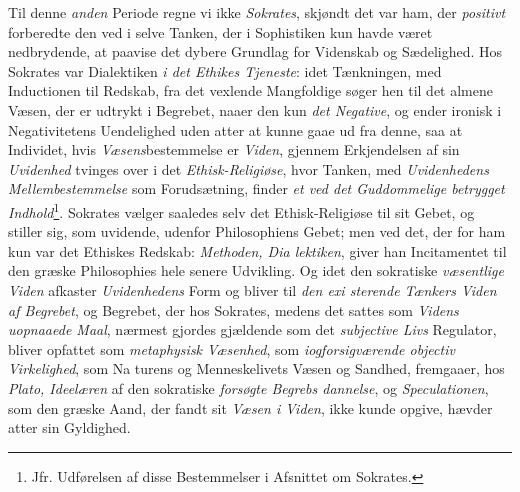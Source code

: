 Til denne \emph{anden} Periode regne vi ikke \emph{Sokrates},
skjøndt det var ham, der \emph{positivt} forberedte den ved i selve
Tanken, der i Sophistiken kun havde været nedbrydende, at
paavise det dybere Grundlag for Videnskab og Sædelighed.
Hos Sokrates var Dialektiken \emph{i det Ethikes Tjeneste}: idet
Tænkningen, med Inductionen til Redskab, fra det vexlende
Mangfoldige søger hen til det almene Væsen, der er udtrykt
i Begrebet, naaer den kun \emph{det Negative}, og ender ironisk
i Negativitetens Uendelighed uden atter at kunne gaae ud fra
denne, saa at Individet, hvis \emph{Væsens}bestemmelse er \emph{Viden},
gjennem Erkjendelsen af sin \emph{Uvidenhed} tvinges over i det
\emph{Ethisk-Religiøse}, hvor Tanken, med \emph{Uvidenhedens
Mellembestemmelse} som Forudsætning, finder \emph{et ved det
Guddommelige betrygget Indhold}\footnote{Jfr. Udførelsen af disse Bestemmelser i Afsnittet om Sokrates.}. Sokrates vælger
saaledes selv det Ethisk-Religiøse til sit Gebet, og stiller sig,
som uvidende, udenfor Philosophiens Gebet; men ved det, der
for ham kun var det Ethiskes Redskab: \emph{Methoden, Dia\-%
lektiken}, giver han Incitamentet til den græske Philosophies
hele senere Udvikling. Og idet den sokratiske \emph{væsentlige
Viden} afkaster \emph{Uvidenhedens} Form og bliver til \emph{den exi\-%
sterende Tænkers Viden af Begrebet}, og Begrebet,
der hos Sokrates, medens det sattes som \emph{Videns uopnaaede
Maal}, nærmest gjordes gjældende som det \emph{subjective Livs}
Regulator, bliver opfattet som \emph{metaphysisk Væsenhed},
som \emph{iogforsigværende objectiv Virkelighed}, som Na\-%
turens og Menneskelivets Væsen og Sandhed, fremgaaer, hos
\emph{Plato, Ideelæren} af den sokratiske \emph{forsøgte Begrebs\-%
dannelse}, og \emph{Speculationen}, som den græske Aand, der
fandt sit \emph{Væsen i Viden}, ikke kunde opgive, hævder atter
sin Gyldighed.

